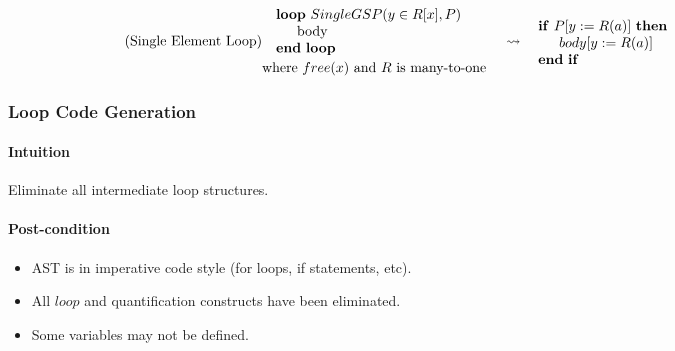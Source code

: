 \documentclass{article}
\begin{document}
\noindent\begin{minipage}{\linewidth}
\begin{align}
  \tag{Single Element Loop}
  \begin{minipage}[]{0.5\textwidth}
  \begin{algorithmic}
    \Loop\ $SingleGSP(y \in R[x], P)$
      \State body
    \EndLoop
  \end{algorithmic}
  \text{where $free(x)$ and $R$ is many-to-one}
  \end{minipage}
  &\leadsto
  \begin{minipage}[]{0.5\textwidth}
  \begin{algorithmic}
    \If{$P[y:=R(a)]$}
      \State $body[y:=R(a)]$
    \EndIf
  \end{algorithmic}
  \end{minipage}
\end{align}
\end{minipage}

\subsubsection{Loop Code Generation}

\paragraph{Intuition} Eliminate all intermediate loop structures.

\paragraph{Post-condition}
\begin{itemize}
  \item AST is in imperative code style (for loops, if statements, etc).
  \item All $loop$ and quantification constructs have been eliminated.
  \item Some variables may not be defined.
\end{itemize}
\end{document}
